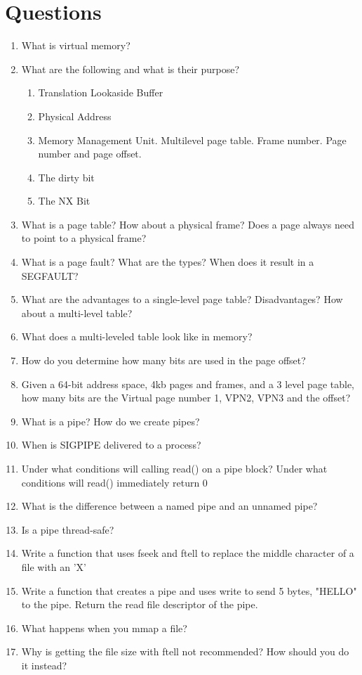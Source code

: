 	\section{Questions}
	 
	\begin{enumerate}
	\item What is virtual memory?
	\item What are the following and what is their purpose?
	 \begin{enumerate}
	 \item Translation Lookaside Buffer
	 \item Physical Address
	 \item Memory Management Unit. Multilevel page table. Frame number. Page number and page offset.
	 \item The dirty bit
	 \item The NX Bit
	 \end{enumerate}
	\item What is a page table? How about a physical frame? Does a page always need to point to a physical frame?
	\item What is a page fault? What are the types? When does it result in a SEGFAULT?
	\item What are the advantages to a single-level page table? Disadvantages? How about a multi-level table?
	\item What does a multi-leveled table look like in memory?
	\item How do you determine how many bits are used in the page offset?
	\item Given a 64-bit address space, 4kb pages and frames, and a 3 level page table, how many bits are the Virtual page number 1, VPN2, VPN3 and the offset?
	\item What is a pipe? How do we create pipes?
	\item When is SIGPIPE delivered to a process?
	\item Under what conditions will calling read() on a pipe block? Under what conditions will read() immediately return 0
	\item What is the difference between a named pipe and an unnamed pipe?
	\item Is a pipe thread-safe?
	\item Write a function that uses fseek and ftell to replace the middle character of a file with an 'X'
	\item Write a function that creates a pipe and uses write to send 5 bytes, "HELLO" to the pipe. Return the read file descriptor of the pipe.
	\item What happens when you mmap a file?
	\item Why is getting the file size with ftell not recommended? How should you do it instead?
	\end{enumerate}
	 
	
	
